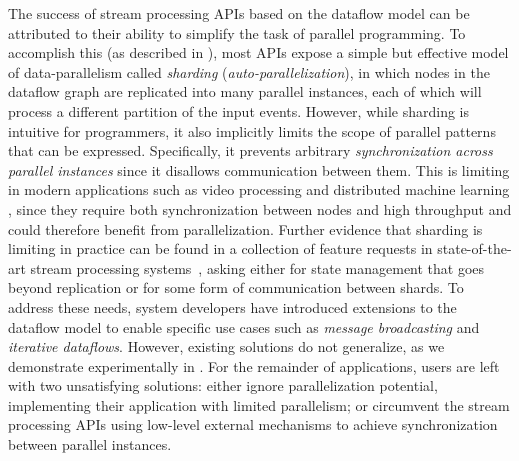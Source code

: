 The success of stream processing APIs based on the dataflow model can be attributed to their ability to simplify the task of parallel programming. To accomplish this (as described in ), most APIs expose a simple but effective model of data-parallelism called \emph{sharding} (\emph{auto-parallelization}), in which
nodes in the dataflow graph are replicated into many parallel instances, each of which
will process a different partition of the input events.
However, while sharding is intuitive for programmers, it also implicitly limits the scope of parallel patterns that
can be expressed. Specifically, it prevents arbitrary
\emph{synchronization across parallel instances}
since it disallows communication between them.
This is limiting in modern applications such as video processing \cite{chienchun2018videoedge} and distributed machine learning \cite{otey2006fast}, since they require both synchronization between nodes and high throughput and could therefore benefit from parallelization.
Further evidence that sharding is limiting in practice
can be found in a collection of feature requests in state-of-the-art stream processing systems~\cite{dgs-feature-request1,dgs-feature-request2,dgs-feature-request3}, asking either for state management that goes beyond replication or for some form of communication between shards.
To address these needs, system developers have introduced
extensions to the dataflow model to enable specific use cases such as  \emph{message broadcasting} and \emph{iterative dataflows}.
However, existing solutions do not generalize,
as we demonstrate experimentally in .
For the remainder of applications, users are left with two unsatisfying solutions: either ignore parallelization potential, implementing their application
with limited parallelism; or circumvent the stream processing APIs using low-level external mechanisms to achieve synchronization between parallel instances.

